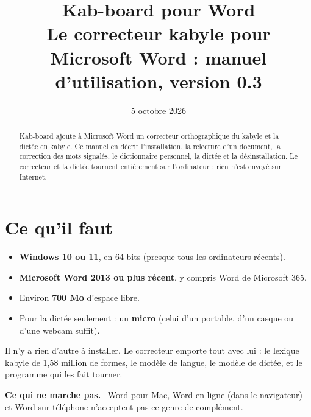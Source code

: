 \documentclass[11pt,a4paper]{article}
\title{Kab-board pour Word\\[0.4em] \large Le correcteur kabyle pour Microsoft Word : manuel d'utilisation, version 0.3}
\author{}
\date{5 octobre 2026}
\newenvironment{encadre}[2][]{\par\medskip\noindent\textbf{#2.}\ }{\par\medskip}
\begin{document}
\maketitle

\begin{abstract}
Kab-board ajoute à Microsoft Word un correcteur orthographique du kabyle et la dictée en kabyle. Ce manuel en décrit l'installation, la relecture d'un document, la correction des mots signalés, le dictionnaire personnel, la dictée et la désinstallation. Le correcteur et la dictée tournent entièrement sur l'ordinateur : rien n'est envoyé sur Internet.
\end{abstract}


\clearpage
\renewcommand{\contentsname}{Sommaire}
\setcounter{tocdepth}{1}
\tableofcontents
\clearpage

\section{Ce qu'il faut}\label{s:faut}
\begin{itemize}
  \item \textbf{Windows 10 ou 11}, en 64 bits (presque tous les ordinateurs récents).
  \item \textbf{Microsoft Word 2013 ou plus récent}, y compris Word de Microsoft 365.
  \item Environ \textbf{700 Mo} d'espace libre.
  \item Pour la dictée seulement : un \textbf{micro} (celui d'un portable, d'un casque ou d'une webcam suffit).
\end{itemize}
Il n'y a rien d'autre à installer. Le correcteur emporte tout avec lui : le lexique kabyle de 1,58 million de formes, le modèle de langue, le modèle de dictée, et le programme qui les fait tourner.

\begin{encadre}{Ce qui ne marche pas}
Word pour Mac, Word en ligne (dans le navigateur) et Word sur téléphone n'acceptent pas ce genre de complément.
\end{encadre}
\end{document}
